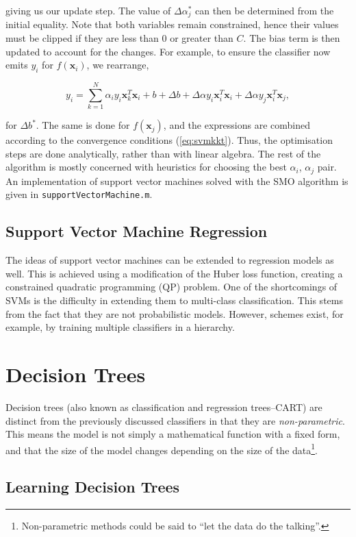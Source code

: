 \documentclass[11pt]{amsart}
\begin{document}
giving us our update step. The value of $\Delta\alpha_j^*$ can then be determined from the initial equality. Note that both variables remain constrained, hence their values must be clipped if they are less than $0$ or greater than $C$. The bias term is then updated to account for the changes. For example, to ensure the classifier now emits $y_i$ for $f(\mathbf{x}_i)$, we rearrange,

$$y_i = \sum_{k=1}^N \alpha_iy_i\mathbf{x}_k^T\mathbf{x}_i + b + \Delta b + \Delta\alpha y_i\mathbf{x}_i^T\mathbf{x}_i + \Delta\alpha y_j\mathbf{x}_i^T\mathbf{x}_j,$$

for $\Delta b^*$. The same is done for $f(\mathbf{x}_j)$, and the expressions are combined according to the convergence conditions (\ref{eq:svmkkt}). Thus, the optimisation steps are done analytically, rather than with linear algebra. The rest of the algorithm is mostly concerned with heuristics for choosing the best $\alpha_i$, $\alpha_j$ pair. An implementation of support vector machines solved with the SMO algorithm is given in \texttt{supportVectorMachine.m}.

\subsection{Support Vector Machine Regression}

The ideas of support vector machines can be extended to regression models as well. This is achieved using a modification of the Huber loss function, creating a constrained quadratic programming (QP) problem. One of the shortcomings of SVMs is the difficulty in extending them to multi-class classification. This stems from the fact that they are not probabilistic models. However, schemes exist, for example, by training multiple classifiers in a hierarchy.

\section{Decision Trees}

Decision trees (also known as classification and regression trees--CART) are distinct from the previously discussed classifiers in that they are \emph{non-parametric}. This means the model is not simply a mathematical function with a fixed form, and that the size of the model changes depending on the size of the data\footnote{Non-parametric methods could be said to ``let the data do the talking''.}.

\subsection{Learning Decision Trees}
\end{document}
